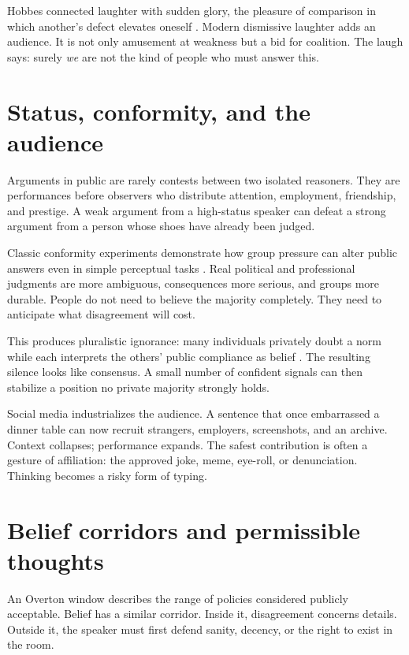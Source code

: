 \documentclass[12pt,a4paper]{book}
\begin{document}
Hobbes connected laughter with sudden glory, the pleasure of comparison in
which another's defect elevates oneself \cite{hobbes1651}.  Modern dismissive
laughter adds an audience.  It is not only amusement at weakness but a bid for
coalition.  The laugh says: surely \emph{we} are not the kind of people who
must answer this.

\section{Status, conformity, and the audience}

Arguments in public are rarely contests between two isolated reasoners.  They
are performances before observers who distribute attention, employment,
friendship, and prestige.  A weak argument from a high-status speaker can
defeat a strong argument from a person whose shoes have already been judged.

Classic conformity experiments demonstrate how group pressure can alter public
answers even in simple perceptual tasks \cite{Asch1956}.  Real political and
professional judgments are more ambiguous, consequences more serious, and
groups more durable.  People do not need to believe the majority completely.
They need to anticipate what disagreement will cost.

This produces pluralistic ignorance: many individuals privately doubt a norm
while each interprets the others' public compliance as belief
\cite{PrenticeMiller1993}.  The resulting silence looks like consensus.  A
small number of confident signals can then stabilize a position no private
majority strongly holds.

Social media industrializes the audience.  A sentence that once embarrassed a
dinner table can now recruit strangers, employers, screenshots, and an archive.
Context collapses; performance expands.  The safest contribution is often a
gesture of affiliation: the approved joke, meme, eye-roll, or denunciation.
Thinking becomes a risky form of typing.

\section{Belief corridors and permissible thoughts}

An Overton window describes the range of policies considered publicly
acceptable.  Belief has a similar corridor.  Inside it, disagreement concerns
details.  Outside it, the speaker must first defend sanity, decency, or the
right to exist in the room.
\end{document}
